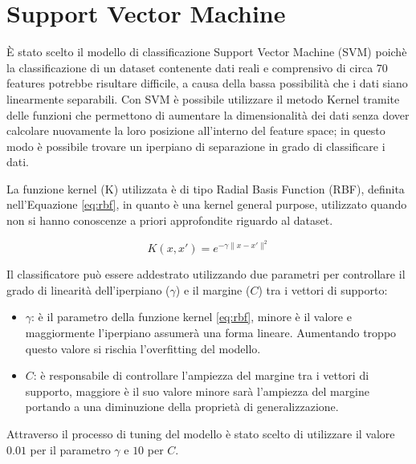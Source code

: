 \section{Support Vector Machine}
È stato scelto il modello di classificazione 
Support Vector Machine (SVM) poichè la classificazione di un dataset contenente 
dati reali e comprensivo di circa 70 features potrebbe risultare difficile, a 
causa della bassa possibilità che i dati siano linearmente separabili. 
Con SVM è possibile utilizzare il metodo Kernel tramite delle funzioni 
che permettono di aumentare la dimensionalità dei dati senza dover 
calcolare nuovamente la loro posizione all'interno del feature space; in questo 
modo è possibile trovare un iperpiano di separazione in grado di classificare 
i dati.

La funzione kernel (K) utilizzata è di tipo Radial Basis Function (RBF), 
definita nell'Equazione \ref{eq:rbf}, in quanto è una kernel general purpose, 
utilizzato quando non si hanno conoscenze a priori approfondite riguardo al 
dataset.

\begin{equation}\label{eq:rbf}
    K(x, x') = e^{- \gamma \|x - x'\|^2}
\end{equation}

Il classificatore può essere addestrato utilizzando due parametri per 
controllare il grado di linearità dell'iperpiano ($\gamma$) e il margine ($C$) 
tra i vettori di supporto:

\begin{itemize}
    \item $\gamma$: è il parametro della funzione kernel \ref{eq:rbf}, minore è 
    il valore e maggiormente l'iperpiano assumerà una forma lineare. 
    Aumentando troppo questo valore si rischia l'overfitting del modello.
    \item $C$: è responsabile di controllare l'ampiezza del margine tra i 
    vettori di supporto, maggiore è il suo valore minore sarà l'ampiezza del 
    margine portando a una diminuzione della proprietà di generalizzazione.
\end{itemize}

Attraverso il processo di tuning del modello è stato scelto di utilizzare il 
valore $0.01$ per il parametro $\gamma$ e $10$ per $C$.
